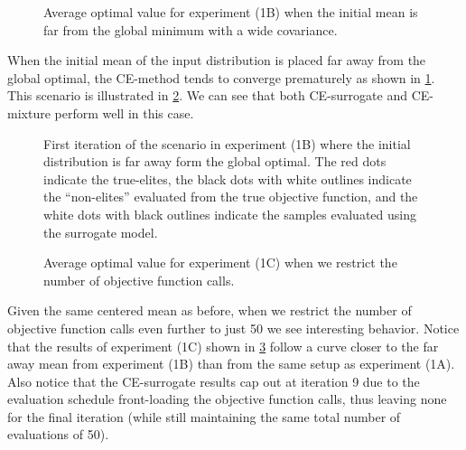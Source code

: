 \begin{figure}[!ht]
  \resizebox{0.9\columnwidth}{!}{}
  \caption{
    \label{fig:experiment_1b}
    Average optimal value for experiment (1B) when the initial mean is far from the global minimum with a wide covariance.
  }
\end{figure}

When the initial mean of the input distribution is placed far away from the global optimal, the CE-method tends to converge prematurely as shown in \cref{fig:experiment_1b}.
This scenario is illustrated in \cref{fig:example_1b}.
We can see that both CE-surrogate and CE-mixture perform well in this case.

\begin{figure}[!h]
  \centering
  \resizebox{0.7\columnwidth}{!}{}
  \caption{
    \label{fig:example_1b}
    First iteration of the scenario in experiment (1B) where the initial distribution is far away form the global optimal. The red dots indicate the true-elites, the black dots with white outlines indicate the ``non-elites'' evaluated from the true objective function, and the white dots with black outlines indicate the samples evaluated using the surrogate model.
  }
\end{figure}



\begin{figure}[!ht]
  \resizebox{0.9\columnwidth}{!}{}
  \caption{
    \label{fig:experiment_1c}
    Average optimal value for experiment (1C) when we restrict the number of objective function calls.
  }
\end{figure}


Given the same centered mean as before, when we restrict the number of objective function calls even further to just 50 we see interesting behavior.
Notice that the results of experiment (1C) shown in \cref{fig:experiment_1c} follow a curve closer to the far away mean from experiment (1B) than from the same setup as experiment (1A). Also notice that the CE-surrogate results cap out at iteration 9 due to the evaluation schedule front-loading the objective function calls, thus leaving none for the final iteration (while still maintaining the same total number of evaluations of 50).




